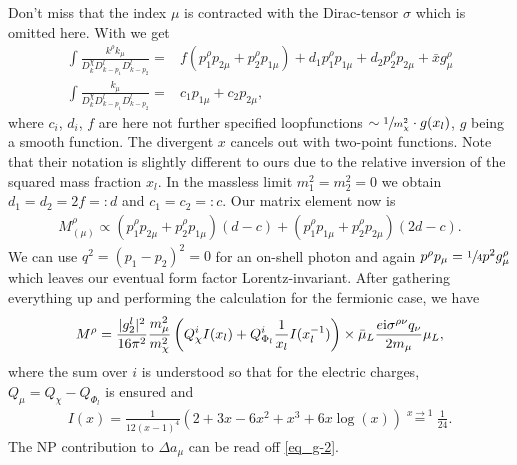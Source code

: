 Don't miss that the index $\mu$ is contracted with the Dirac-tensor $\sigma$ which is omitted here. With \cite{Lavoura} we get
\begin{align}
 \int\frac{ k^\rho k_\mu}{D^\chi_kD^l_{k-p_1}D^l_{k-p_2}} =&  f (p_1^\rho p_{2\mu} + p_2^\rho p_{1\mu}) +  d_1p_1^\rho p_{1\mu} +  d_2p_2^\rho p_{2\mu} + \bar x g^\rho_\mu\\
 \int\frac{k_\mu}{D^\chi_kD^l_{k-p_1}D^l_{k-p_2}} =&  c_1 p_{1\mu} +  c_2 p_{2\mu},
\end{align}
where $c_i$, $d_i$, $f$ are here not further specified loopfunctions $\sim \sfrac{1}{m^2_\chi} \cdot g(x_l)$, $g$ being a smooth function. The divergent $x$
cancels out with two-point functions. Note that their notation is slightly different to ours due to the relative inversion of the squared mass 
fraction $x_l$. In the massless limit $m_1^2 = m_2^2 = 0$ we obtain $d_1 = d_2 = 2f =: d$ and $c_1 = c_2 =: c$. Our matrix element now is
\begin{align}
 M^\rho_{(\mu)} \propto (p_1^\rho p_{2\mu} + p_2^\rho p_{1\mu}) (d-c) + (p_1^\rho p_{1\mu} + p_2^\rho p_{2\mu}) (2d-c).
\end{align}
We can use $q^2 = (p_1-p_2)^2 = 0$ for an on-shell photon and again $p^\rho p_\mu = \sfrac{1}{4} p^2 g^\rho_\mu $ which leaves our eventual form factor 
Lorentz-invariant. After gathering everything up and performing the calculation for the fermionic case, we have
\begin{align}
 M^\rho = \frac{|g^l_2|^2}{16\pi^2} \frac{m^2_\mu}{m_\chi^2}\left(Q_\chi^i I(x_l) + Q_{\Phi_l}^i \frac{1}{x_l} I(x_l^{-1}) \right)\times \bar \mu_L\frac{e\text{i}\sigma^{\rho\nu}q_\nu}{2m_\mu} \mu_L,
 \label{eq_g-2}
\end{align}
where the sum over $i$ is understood so that for the electric charges, $Q_\mu = Q_\chi - Q_{\Phi_l}$ is ensured and
\begin{align}
 I(x) = \frac{1}{12(x-1)^4}\left(2+3x-6x^2+x^3+6x\log(x) \right) \stackrel{x\rightarrow1}{=} \frac{1}{24}.
\end{align}
The NP contribution to $\Delta a_\mu$ can be read off \eqref{eq_g-2}.
